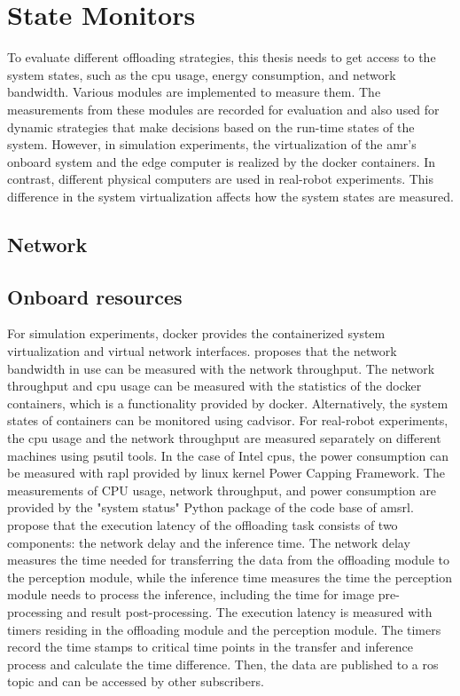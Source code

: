 \section{State Monitors}\label{sec:state_monitors}

To evaluate different offloading strategies, this thesis needs to get access to the system states, such as the \gls{cpu} usage, energy consumption, and network bandwidth. Various modules are implemented to measure them. 
The measurements from these modules are recorded for evaluation and also used for dynamic strategies that make decisions based on the run-time states of the system. However, in simulation experiments, the virtualization of the \gls{amr}'s onboard system and the edge computer is realized by the \gls{docker} containers. In contrast, different physical computers are used in real-robot experiments. This difference in the system virtualization affects how the system states are measured. 

\subsection{Network}

\subsection{Onboard resources}
For simulation experiments, \gls{docker} provides the containerized system virtualization and virtual network interfaces. \citeauthor*{Ruggeri2022} \cite{Ruggeri2022} proposes that the network bandwidth in use can be measured with the network throughput. The network throughput and \gls{cpu} usage can be measured with the statistics of the \gls{docker} containers, which is a functionality provided by \gls{docker}. Alternatively, the system states of containers can be monitored using \gls{cadvisor}. For real-robot experiments, the \gls{cpu} usage and the network throughput are measured separately on different machines using \gls{psutil} tools. In the case of Intel \glspl{cpu}, the power consumption can be measured with \gls{rapl} provided by \gls{linux} kernel Power Capping Framework. The measurements of CPU usage, network throughput, and power consumption are provided by the "system status" Python package of the code base of \gls{amsrl}. \citeauthor*{Xie2021} \cite{Xie2021} propose that the execution latency of the offloading task consists of two components: the network delay and the inference time. The network delay measures the time needed for transferring the data from the offloading module to the perception module, while the inference time measures the time the perception module needs to process the inference, including the time for image pre-processing and result post-processing. The execution latency is measured with timers residing in the offloading module and the perception module. The timers record the time stamps to critical time points in the transfer and inference process and calculate the time difference. Then, the data are published to a \gls{ros} topic and can be accessed by other subscribers. 


